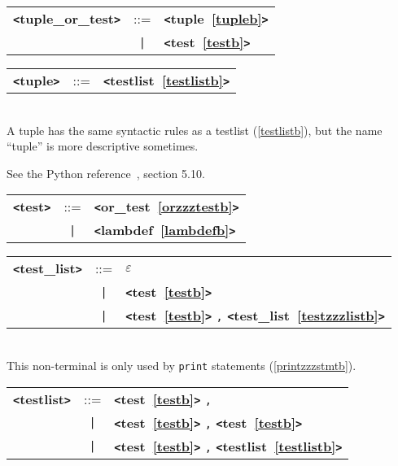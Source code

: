 
\label{tuplezzzorzzztestb}
\begin{tabular}{lcl}
{\bf \verb+<+tuple\_or\_test\verb+>+} & ::=  & {\bf \verb+<+tuple~\ref{tupleb}\verb+>+}  \\
 & \verb+|+  & {\bf \verb+<+test~\ref{testb}\verb+>+}  \\
\end{tabular}

\label{tupleb}
\begin{tabular}{lcl}
{\bf \verb+<+tuple\verb+>+} & ::=  & {\bf \verb+<+testlist~\ref{testlistb}\verb+>+}  \\
\end{tabular} \\

A tuple has the same syntactic rules as a testlist (\ref{testlistb}), but the name ``tuple'' is more descriptive sometimes.

\label{testb}

See the Python reference~\cite{pythonlang}, section 5.10.

\begin{tabular}{lcl}
{\bf \verb+<+test\verb+>+} & ::=  & {\bf \verb+<+or\_test~\ref{orzzztestb}\verb+>+}  \\
 & \verb+|+  & {\bf \verb+<+lambdef~\ref{lambdefb}\verb+>+}  \\
\end{tabular}

\label{testzzzlistb}
\begin{tabular}{lcl}
{\bf \verb+<+test\_list\verb+>+} & ::=  & $\varepsilon$ \\
 & \verb+|+  & {\bf \verb+<+test~\ref{testb}\verb+>+}  \\
 & \verb+|+  & {\bf \verb+<+test~\ref{testb}\verb+>+}  \verb|,| {\bf \verb+<+test\_list~\ref{testzzzlistb}\verb+>+}  \\
\end{tabular} \\

This non-terminal is only used by \verb|print| statements (\ref{printzzzstmtb}).

\label{testlistb}
\begin{tabular}{lcl}
{\bf \verb+<+testlist\verb+>+} & ::=  & {\bf \verb+<+test~\ref{testb}\verb+>+}  \verb|,| \\
 & \verb+|+  & {\bf \verb+<+test~\ref{testb}\verb+>+}  \verb|,| {\bf \verb+<+test~\ref{testb}\verb+>+}  \\
 & \verb+|+  & {\bf \verb+<+test~\ref{testb}\verb+>+}  \verb|,| {\bf \verb+<+testlist~\ref{testlistb}\verb+>+}  \\
\end{tabular} \\

